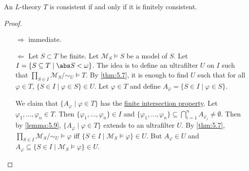 \documentclass{article}
\let\models\vDash
\begin{document}
\begin{nthm}[Compactness] \label{thm:5.11}
An $L$-theory $T$ is consistent if and only if it is finitely consistent.
\end{nthm}
\begin{proof}
\begin{itemize}
\item[$\Rightarrow$] immediate.
\item[$\Leftarrow$] Let $S \subset T$ be finite. Let $\mathcal{M}_S \models S$ be a model of $S$. Let $I = \{S \subseteq T \mid \abs S < \omega\}$. The idea is to define an ultrafilter $U$ on $I$ such that $\prod_{S \in I} \mathcal{M}_S / {\sim_U} \models T$. By \cref{thm:5.7}, it is enough to find $U$ such that for all $\varphi \in T$, $\{S \in I \mid \varphi \in S\} \in U$. Let $\varphi \in T$ and define $A_\varphi = \{S \in I \mid \varphi \in S\}$.

We claim that  $\{A_\varphi \mid \varphi \in T\}$ has the \hyperlink{fip}{finite intersection property}.
Let $\varphi_1, \dots, \varphi_n \in T$. Then $\{\varphi_1, \dots, \varphi_n \} \in I$ and $\{\varphi_1, \dots, \varphi_n \} \subseteq \bigcap_{i=1}^n A_{\varphi_i} \neq \emptyset$. Then by \cref{lemma:5.9}, $\{A_\varphi \mid \varphi \in T\}$ extends to an ultrafilter $U$. By \cref{thm:5.7}, $\prod_{S \in I} \mathcal{M}_S / {\sim_U} \models \varphi$ iff $\{S \in I \mid \mathcal{M}_S \models \varphi\} \in U$. But $A_\varphi \in U$ and $A_\varphi \subseteq \{S \in I \mid \mathcal{M}_S \models \varphi\} \in U$.
\end{itemize}
\end{proof}
\end{document}
